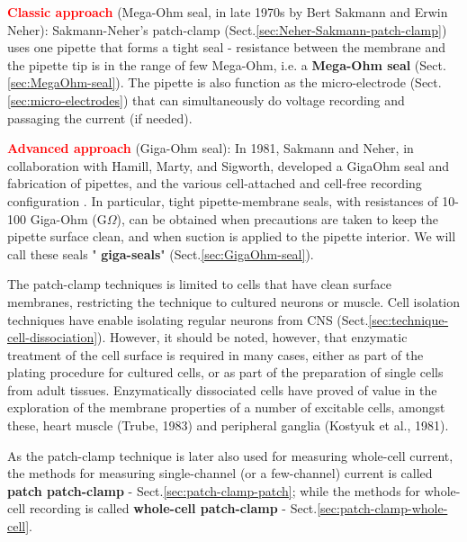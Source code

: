 \textcolor{red}{\bf Classic approach} (Mega-Ohm seal, in late 1970s by Bert
Sakmann and Erwin Neher):
Sakmann-Neher's patch-clamp (Sect.\ref{sec:Neher-Sakmann-patch-clamp}) uses one
pipette that forms a tight seal - resistance between the membrane and the
pipette tip is in the range of few Mega-Ohm, i.e. a {\bf Mega-Ohm seal}
(Sect.\ref{sec:MegaOhm-seal}).
The pipette is also function as the micro-electrode
(Sect.\ref{sec:micro-electrodes}) that can simultaneously do voltage recording
and passaging the current (if needed).


\textcolor{red}{\bf Advanced approach} (Giga-Ohm seal): In 1981, Sakmann and
Neher, in collaboration with Hamill, Marty, and Sigworth, developed a GigaOhm
seal and fabrication of pipettes, and the various cell-attached and cell-free
recording configuration \citep{hamill1981}. In particular, tight
pipette-membrane seals, with resistances of 10-100 Giga-Ohm (G$\Omega$), can be
obtained when precautions are taken to keep the pipette surface clean, and when
suction is applied to the pipette interior. We will call these seals "{\bf
giga-seals}" (Sect.\ref{sec:GigaOhm-seal}).


\begin{mdframed}

The patch-clamp techniques  is limited to cells that have clean surface
membranes, restricting the technique to cultured neurons or muscle.
Cell isolation techniques have enable isolating regular neurons from CNS
(Sect.\ref{sec:technique-cell-dissociation}).
However, it should be noted, however, that enzymatic treatment of the cell
surface is required in many cases, either as part of the plating procedure for
cultured cells, or as part of the preparation of single cells from adult
tissues. Enzymatically dissociated cells have proved of value  in  the
exploration of the membrane properties of a  number of excitable cells, amongst
these, heart muscle (Trube, 1983) and peripheral ganglia (Kostyuk et al.,
1981).

\end{mdframed}

As the patch-clamp technique is later also used for measuring whole-cell
current, the methods for measuring single-channel (or a few-channel) current is
called {\bf patch patch-clamp} - Sect.\ref{sec:patch-clamp-patch}; while the
methods for whole-cell recording is called {\bf whole-cell patch-clamp} -
Sect.\ref{sec:patch-clamp-whole-cell}.




